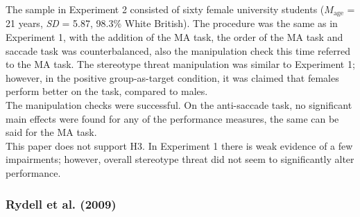 \documentclass[
  stu,floatsintext]{apa7}
\begin{document}
The sample in Experiment 2 consisted of sixty female university students (\(M_{\text{age}}\) = 21 years, \emph{SD} = 5.87, 98.3\% White British).
The procedure was the same as in Experiment 1, with the addition of the MA task, the order of the MA task and saccade task was counterbalanced, also the manipulation check this time referred to the MA task.
The stereotype threat manipulation was similar to Experiment 1; however, in the positive group-as-target condition, it was claimed that females perform better on the task, compared to males.\\
The manipulation checks were successful.
On the anti-saccade task, no significant main effects were found for any of the performance measures, the same can be said for the MA task.\\
This paper does not support H3. In Experiment 1 there is weak evidence of a few impairments; however, overall stereotype threat did not seem to significantly alter performance.

\subsubsection{Rydell et al. (2009)}\label{rydellmultiplesocialidentities2009}
\end{document}
